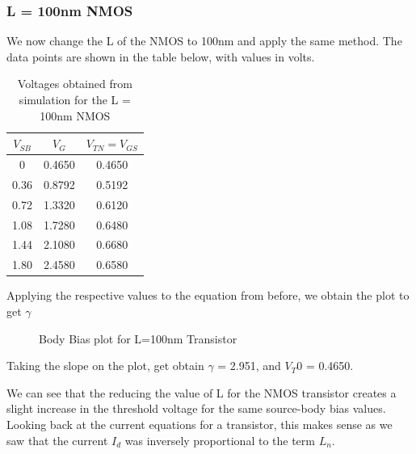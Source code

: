 \documentclass[12pt]{article}
\begin{document}
\subsubsection{L = 100nm NMOS}
We now change the L of the NMOS to 100nm and apply the same method. The data points are shown in the table below, with values in volts.
\begin{table} [H]
    \centering
    \begin{tabular} {ccc}
        $V_{SB}$ & $V_{G}$ & $V_{TN} = V_{GS}$\\
        \hline
        0 & 0.4650 & 0.4650\\
        0.36 & 0.8792 & 0.5192\\
        0.72 & 1.3320 & 0.6120\\
        1.08 & 1.7280 & 0.6480\\
        1.44 & 2.1080 & 0.6680\\
        1.80 & 2.4580 & 0.6580\\
    \end{tabular}
    \caption{Voltages obtained from simulation for the L = 100nm NMOS}
\end{table}
Applying the respective values to the equation from before, we obtain the plot to get $\gamma$
\begin{figure} [H]
    \centering
    \caption{Body Bias plot for L=100nm Transistor}
\end{figure}
Taking the slope on the plot, get obtain $\gamma$ = 2.951, and $V_T0$ = 0.4650.

We can see that the reducing the value of L for the NMOS transistor creates a slight increase in the threshold voltage for the same
source-body bias values. Looking back at the current equations for a transistor, this makes sense as we saw that the current $I_d$ was 
inversely proportional to the term $L_n$. 
\end{document}
